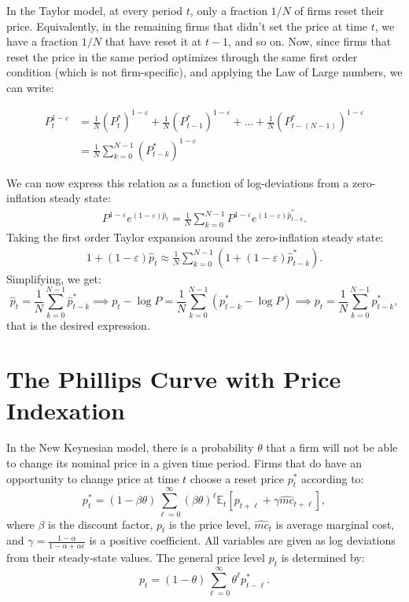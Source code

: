 \documentclass[dvipsnames,11pt]{article}
\begin{document}
\begin{enumerate}
            \begin{solution}
In the Taylor model, at every period $t$, only a fraction $1/N$ of firms reset their price. Equivalently, in the remaining firms that didn't set the price at time $t$, we have a fraction $1/N$ that have reset it at $t-1$, and so on.  Now, since firms that reset the price in the same period optimizes through the same first order condition (which is not firm-specific), and applying the Law of Large numbers, we can write:

\begin{align*}
    P_t^{1-\varepsilon}&=\frac{1}{N}(P_t^*)^{1-\varepsilon}+\frac{1}{N} (P_{t-1}^*)^{1-\varepsilon} + \dots + \frac{1}{N} (P_{t-(N-1)}^*)^{1-\varepsilon} \\
    &= \frac{1}{N} \sum_{k=0}^{N-1}(P_{t-k}^*)^{1-\varepsilon}
\end{align*}

We can now express this relation as a function of log-deviations from a zero-inflation steady state:
\begin{align*}
    P^{1-\varepsilon}e^{(1-\varepsilon)\hat p_t}=\frac{1}{N} \sum_{k=0}^{N-1}P^{1-\varepsilon}e^{(1-\varepsilon)\hat p_{t-k}^*}.
\end{align*}
Taking the first order Taylor expansion around the zero-inflation steady state:
\begin{align*}
    1+(1-\varepsilon)\hat p_t \approx \frac{1}{N}\sum_{k=0}^{N-1} (1+(1-\varepsilon)\hat p_{t-k}^*).
\end{align*}
Simplifying, we get:
\[
\hat p_t=\frac{1}{N}\sum_{k=0}^{N-1}\hat p_{t-k}^* \implies p_t-\log P = \frac{1}{N}\sum_{k=0}^{N-1}(p_{t-k}^*-\log P) \implies p_t=\frac{1}{N}\sum_{k=0}^{N-1}p_{t-k}^*,
\]
that is the desired expression. 
                
            \end{solution}
    
    \end{enumerate}

\section{The Phillips Curve with Price Indexation}

    In the New Keynesian model, there is a probability $\theta$ that a firm will not be able to change its nominal price in a given time period. Firms that do have an opportunity to change price at time $t$ choose a reset price $p^*_t$ according to:
    \[
    p^*_t = (1 - \beta \theta) \sum_{\ell=0}^\infty (\beta \theta)^\ell \mathbb{E}_t [p_{t+\ell} + \gamma \widehat{mc}_{t + \ell }],
    \]
    where $\beta$ is the discount factor, $p_t$ is the price level, $\widehat{mc}_t$ is average marginal cost, and $\gamma = \frac{1 - \alpha}{1 - \alpha + \alpha \epsilon}$ is a positive coefficient. All variables are given as log deviations from their steady-state values. The general price level $p_t$ is determined by:
    \[
    p_t = (1 - \theta) \sum_{\ell=0}^\infty \theta^\ell p^*_{t-\ell}.
    \]
\end{document}
